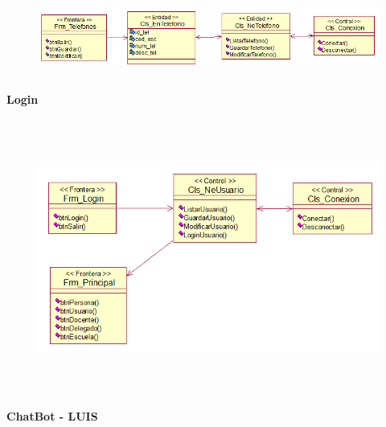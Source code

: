 \documentclass[12pt]{report}
\begin{document}
\begin{itemize}
\begin{figure}[H]
	\begin{Center}
		\includegraphics[width=6.33in,height=1.08in]{./media/image17.png}
	\end{Center}
\end{figure}



\par

{\fontsize{10pt}{12.0pt}\selectfont \textbf{Login}\par}\par




\begin{figure}[H]
	\begin{Center}
		\includegraphics[width=6.33in,height=3.56in]{./media/image18.png}
	\end{Center}
\end{figure}



\par


\vspace{\baselineskip}
{\fontsize{10pt}{12.0pt}\selectfont \textbf{ChatBot - LUIS}\par}\par




\end{itemize}
\end{document}
